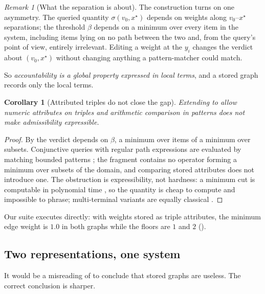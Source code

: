 \documentclass[11pt,twocolumn,a4paper]{article}
\theoremstyle{thmstyle}
\newtheorem{corollary}[theorem]{Corollary}
\theoremstyle{definition}
\theoremstyle{remark}
\newtheorem{remark}[theorem]{Remark}
\newcommand{\flo}{\beta}
\newcommand{\sepc}{\sigma}
\begin{document}
\begin{remark}[What the separation is about]
\label{rem:sepmeaning}
The construction turns on one asymmetry. The queried quantity
$\sepc(v_0,x^\star)$ depends on weights along $v_0$--$x^\star$ separations;
the threshold $\flo$ depends on a minimum over every item in the system,
including items lying on no path between the two and, from the query's point
of view, entirely irrelevant. Editing a weight at the $y_i$ changes the
verdict about $(v_0,x^\star)$ without changing anything a pattern-matcher
could match.

So \emph{accountability is a global property expressed in local terms}, and a
stored graph records only the local terms.
\end{remark}

\begin{corollary}[Attributed triples do not close the gap]
\label{cor:attributed}
Extending  to allow numeric attributes on triples and
arithmetic comparison in patterns does not make admissibility expressible.
\end{corollary}

\begin{proof}
By  the verdict depends on $\flo$, a minimum over items
of a minimum over subsets. Conjunctive queries with regular path expressions
are evaluated by matching bounded patterns
\citep{perez2009,angles2017,barcelo2013}; the
fragment contains no operator forming a minimum over subsets of the domain,
and comparing stored attributes does not introduce one. The obstruction is
expressibility, not hardness: a minimum cut is computable in polynomial time
\citep{fordfulkerson1956,stoer1997}, so the quantity is cheap to compute and
impossible to phrase; multi-terminal variants are equally classical
\citep{gomory1961,menger1927}.
\end{proof}

Our suite executes  directly: with weights stored as
triple attributes, the minimum edge weight is $1.0$ in both graphs while the
floors are $1$ and $2$ ().

\subsection{Two representations, one system}

It would be a misreading of  to conclude that stored
graphs are useless. The correct conclusion is sharper.
\end{document}
